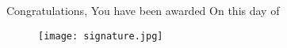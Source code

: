 \documentclass{article}
\begin{document}
Congratulations,
You have been awarded
On this day of \date{\today{}}
\begin{figure}
\texttt{[image: signature.jpg]}
\end{figure}
\end{document}
